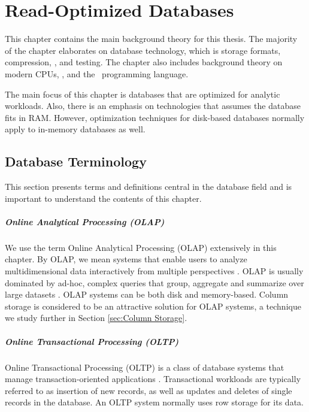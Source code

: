 \chapter{Read-Optimized Databases}
\label{chap:olap}

This chapter contains the main background theory for this thesis. The majority of the chapter elaborates on database technology, which is storage formats, compression, \bi, and testing. The chapter also includes background theory on modern CPUs, \mde, and the \delphi~programming language. 

The main focus of this chapter is databases that are optimized for analytic workloads. Also, there is an emphasis on technologies that assumes the database fits in RAM. However, optimization techniques for disk-based databases normally apply to in-memory databases as well.


\clearpage

\section{Database Terminology}
\label{sec:Database Terminology}
This section presents terms and definitions central in the database field and is important to understand the contents of this chapter.

\paragraph{Online Analytical Processing (OLAP)}
\label{par:Online Analytical Processing (OLAP)}
  We use the term Online Analytical Processing (OLAP) extensively in this chapter. By OLAP, we mean systems that enable users to analyze multidimensional data interactively from multiple perspectives \cite{Wikipedia_contributors2015-hw}. OLAP is usually dominated by ad-hoc, complex queries that group, aggregate and summarize over large datasets \cite{Bjorklund2011-wh}. OLAP systems can be both disk and memory-based. Column storage is considered to be an attractive solution for OLAP systems, a technique we study further in Section \ref{sec:Column Storage}.


\paragraph{Online Transactional Processing (OLTP)}
\label{par:Online Transactional Processing (OLTP)}
Online Transactional Processing (OLTP) is a class of database systems that manage transaction-oriented applications \cite{Wikipedia_contributors2015-cw}. Transactional workloads are typically referred to as insertion of new records, as well as updates and deletes of single records in the database. An OLTP system normally uses row storage for its data.

